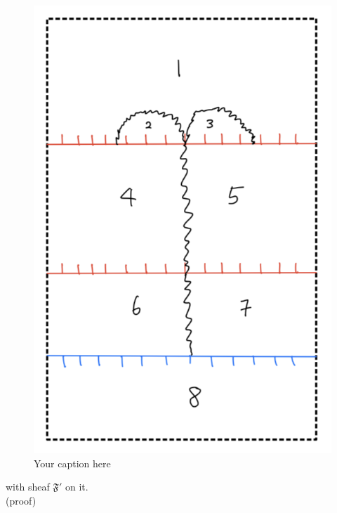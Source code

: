 \begin{figure}[H] %
    \centering
    \includegraphics[width=\linewidth]{diagrams/lemma8/2.png} %
    \caption{Your caption here}
    \label{fig:your-label}
\end{figure}

with sheaf $\mathfrak{F}'$ on it.\\
(proof)